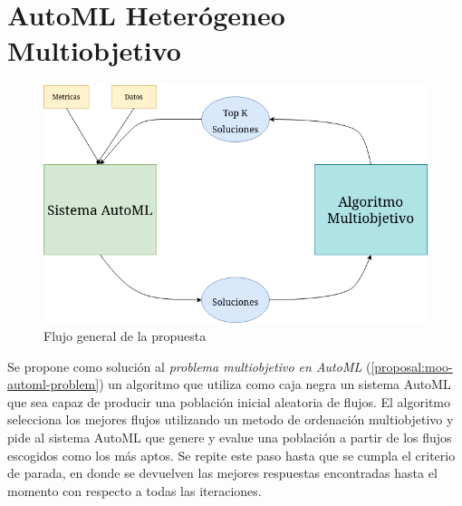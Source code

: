 
\chapter{AutoML Heter\'ogeneo Multiobjetivo}\label{chapter:proposal}


\begin{figure}[ht]
    \centering
    \includegraphics[scale=0.60]{Pictures/automl_moo_proposal.png}
    \caption{Flujo general de la propuesta}\label{proposal:fig:flux}
\end{figure}

Se propone como soluci\'on al  \textit{problema multiobjetivo en AutoML} (\ref{proposal:moo-automl-problem}) un algoritmo que utiliza como caja negra un sistema AutoML que sea capaz de producir una poblaci\'on inicial aleatoria de flujos. El algoritmo selecciona los mejores flujos utilizando un metodo de ordenaci\'on multiobjetivo y pide al sistema AutoML que genere y evalue una poblaci\'on a partir de los flujos escogidos como los m\'as aptos. 
Se repite este paso hasta que se cumpla el criterio de parada, en donde se devuelven las mejores respuestas encontradas hasta el momento con respecto a todas las iteraciones.


